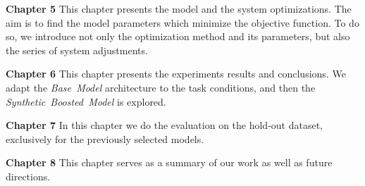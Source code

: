 \vspace{0.2cm}
\noindent\textbf{Chapter 5}\hspace{0.2cm} This chapter presents the model and the system optimizations.
The aim is to find the model parameters which minimize the objective function.
To do so, we introduce not only the optimization method and its parameters, but also
the series of system adjustments.

\vspace{0.2cm}
\noindent\textbf{Chapter 6}\hspace{0.2cm} This chapter presents the experiments results
and conclusions.
We adapt the \textit{Base~Model} architecture to the task conditions, and then
the \textit{Synthetic~Boosted~Model} is explored.

\vspace{0.2cm}
\noindent\textbf{Chapter 7}\hspace{0.2cm} In this chapter we do the evaluation on the hold-out dataset,
exclusively for the previously selected models.

\vspace{0.2cm}
\noindent\textbf{Chapter 8}\hspace{0.2cm} This chapter serves as a summary of our work as well as future
directions.

